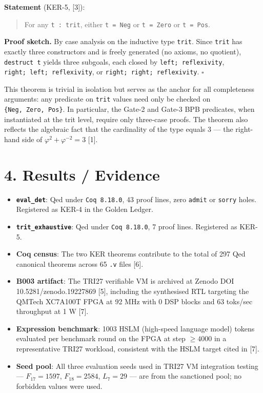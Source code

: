 \textbf{Statement} (KER-5,
[3]):

\begin{quote}
For any \texttt{t\ :\ trit}, either
\texttt{t\ =\ Neg} or \texttt{t\ =\ Zero} or
\texttt{t\ =\ Pos}.
\end{quote}

\textbf{Proof sketch.} By case analysis on the
inductive type \texttt{trit}. Since \texttt{trit}
has exactly three constructors and is freely
generated (no axioms, no quotient),
\texttt{destruct\ t} yields three subgoals, each
closed by \texttt{left;\ reflexivity},
\texttt{right;\ left;\ reflexivity}, or
\texttt{right;\ right;\ reflexivity}. \(\square\)

This theorem is trivial in isolation but serves as
the anchor for all completeness arguments: any
predicate on \texttt{trit} values need only be
checked on \texttt{\{Neg,\ Zero,\ Pos\}}. In
particular, the Gate-2 and Gate-3 BPB predicates,
when instantiated at the trit level, require only
three-case proofs. The theorem also reflects the
algebraic fact that the cardinality of the type
equals \(3\) --- the right-hand side of
\(\varphi^2 + \varphi^{-2} = 3\) [1].

\section{4. Results /
Evidence}\label{fa_27:results-evidence}

\begin{itemize}
\tightlist
\item
  \textbf{\texttt{eval\_det}}: Qed under
  \texttt{Coq\ 8.18.0}, 43 proof lines, zero
  \texttt{admit} or \texttt{sorry} holes.
  Registered as KER-4 in the Golden Ledger.
\item
  \textbf{\texttt{trit\_exhaustive}}: Qed under
  \texttt{Coq\ 8.18.0}, 7 proof lines. Registered
  as KER-5.
\item
  \textbf{Coq census}: The two KER theorems
  contribute to the total of 297 Qed canonical
  theorems across 65 \texttt{.v} files [6].
\item
  \textbf{B003 artifact}: The TRI27 verifiable VM
  is archived at Zenodo DOI
  10.5281/zenodo.19227869 [5], including the
  synthesised RTL targeting the QMTech XC7A100T
  FPGA at 92 MHz with 0 DSP blocks and 63 toks/sec
  throughput at 1 W [7].
\item
  \textbf{Expression benchmark}: 1003 HSLM
  (high-speed language model) tokens evaluated per
  benchmark round on the FPGA at step
  \(\geq 4000\) in a representative TRI27
  workload, consistent with the HSLM target cited
  in [7].
\item
  \textbf{Seed pool}: All three evaluation seeds
  used in TRI27 VM integration testing ---
  \(F_{17} = 1597\), \(F_{18} = 2584\),
  \(L_7 = 29\) --- are from the sanctioned pool;
  no forbidden values were used.
\end{itemize}

